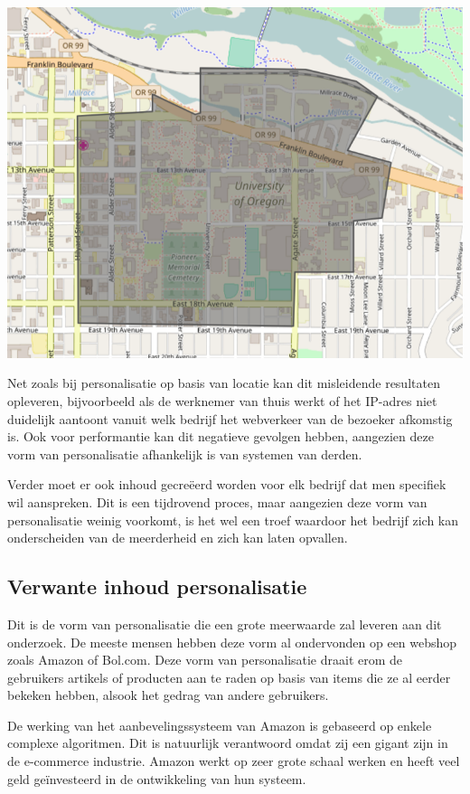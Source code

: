 	\includegraphics[width=\linewidth]{img/e2fcfe784532c41a644e4465f535530d}

Net zoals bij personalisatie op basis van locatie kan dit misleidende resultaten opleveren, bijvoorbeeld als de werknemer van thuis werkt of het IP-adres niet duidelijk aantoont vanuit welk bedrijf het webverkeer van de bezoeker afkomstig is. Ook voor performantie kan dit negatieve gevolgen hebben, aangezien deze vorm van personalisatie afhankelijk is van systemen van derden. 

Verder moet er ook inhoud gecreëerd worden voor elk bedrijf dat men specifiek wil aanspreken. Dit is een tijdrovend proces, maar aangezien deze vorm van personalisatie weinig voorkomt, is het wel een troef waardoor het bedrijf zich kan onderscheiden van de meerderheid en zich kan laten opvallen.

  
 \subsection{Verwante inhoud personalisatie}
 \label{subsec:Verwante inhoud personalisatie}
 
 Dit is de vorm van personalisatie die een grote meerwaarde zal leveren aan dit onderzoek. De meeste mensen hebben deze vorm al ondervonden op een webshop zoals Amazon of Bol.com. Deze vorm van personalisatie draait erom de gebruikers artikels of producten aan te raden op basis van items die ze al eerder bekeken hebben, alsook het gedrag van andere gebruikers.
 
De werking van het aanbevelingssysteem van Amazon is gebaseerd op enkele complexe algoritmen. \autocite{Linden2003} Dit is natuurlijk verantwoord omdat zij een gigant zijn in de e-commerce industrie. Amazon werkt op zeer grote schaal werken en heeft veel geld geïnvesteerd in de ontwikkeling van hun systeem. 

